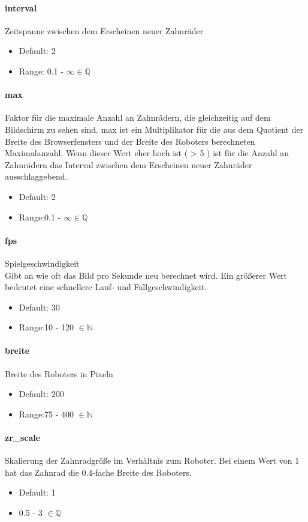 \documentclass[]{article}
\begin{document}
\begin{multicols}{2}
	\paragraph{interval}  Zeitspanne zwischen dem Erscheinen neuer Zahnräder
	\begin{itemize}
		\item Default: 2
		\item Range: 0.1 - $\infty \in \mathbb{Q}$
	\end{itemize}
	\paragraph{max}  Faktor für die maximale Anzahl an Zahnrädern, die gleichzeitig auf dem Bildschirm zu sehen sind.  max ist ein Multiplikator für die aus dem Quotient der Breite des Browserfensters und der Breite des Roboters berechneten Maximalanzahl. Wenn dieser Wert eher hoch ist ( > 5 ) ist für die Anzahl an Zahnrädern das Interval zwischen dem Erscheinen neuer Zahnräder ausschlaggebend.
	\begin{itemize}
		\item Default: 2
		\item Range:0.1 - $\infty \in \mathbb{Q}$
	\end{itemize}


	\paragraph{fps}  Spielgeschwindigkeit \\
	Gibt an wie oft das Bild pro Sekunde neu berechnet wird. Ein größerer Wert bedeutet eine schnellere Lauf- und Fallgeschwindigkeit.
	\begin{itemize}

		\item Default: 30
		\item Range:10 - 120 $\in \mathbb{N} $

	\end{itemize}
	\paragraph{breite}  Breite des Roboters in Pixeln
	\begin{itemize}
		\item Default: 200
		\item Range:75 - 400 $\in \mathbb{N}$
	\end{itemize}
	\paragraph{zr\_scale}  Skalierung der Zahnradgröße im Verhältnis zum Roboter. Bei einem Wert von 1 hat das Zahnrad die 0.4-fache Breite des Roboters.
	\begin{itemize}
		\item Default: 1
		\item 0.5 - 3 $\in \mathbb{Q} $
	\end{itemize}

 
	\end{multicols}
\end{document}
